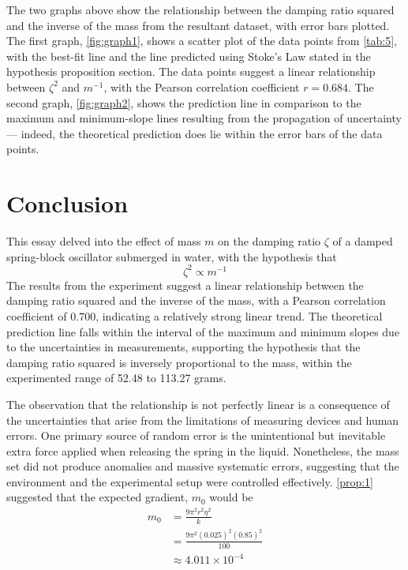 \documentclass[a4paper,12pt]{article}
\begin{document}
The two graphs above show the relationship between the damping ratio squared and the inverse of the mass from the resultant dataset, with error bars plotted. The first graph, \cref{fig:graph1}, shows a scatter plot of the data points from \cref{tab:5}, with the best-fit line and the line predicted using Stoke's Law stated in the hypothesis proposition section. The data points suggest a linear relationship between $\zeta^2$ and $m^{-1}$, with the Pearson correlation coefficient $r = 0.684$. The second graph, \cref{fig:graph2}, shows the prediction line in comparison to the maximum and minimum-slope lines resulting from the propagation of uncertainty --- indeed, the theoretical prediction does lie within the error bars of the data points.

\section{Conclusion}

This essay delved into the effect of mass $m$ on the damping ratio $\zeta$ of a damped spring-block oscillator submerged in water, with the hypothesis that $$\zeta^2 \propto m^{-1}$$ The results from the experiment suggest a linear relationship between the damping ratio squared and the inverse of the mass, with a Pearson correlation coefficient of 0.700, indicating a relatively strong linear trend. The theoretical prediction line falls within the interval of the maximum and minimum slopes due to the uncertainties in measurements, supporting the hypothesis that the damping ratio squared is inversely proportional to the mass, within the experimented range of 52.48 to 113.27 grams.


The observation that the relationship is not perfectly linear is a consequence of the uncertainties that arise from the limitations of measuring devices and human errors. One primary source of random error is the unintentional but inevitable extra force applied when releasing the spring in the liquid. Nonetheless, the mass set did not produce anomalies and massive systematic errors, suggesting that the environment and the experimental setup were controlled effectively. \cref{prop:1} suggested that the expected gradient, $m_0$ would be \begin{align*}
  m_0 & =    \frac{9\pi^2r^2\eta^2}{k}               \\
      & =        \frac{9\pi^2(0.025)^2(0.85)^2}{100} \\
      & \approx  4.011 \times 10^{-4}
\end{align*}
\end{document}
